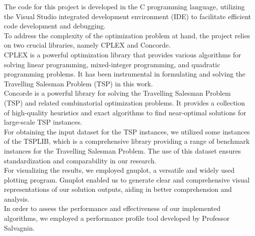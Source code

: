 The code for this project is developed in the C programming language, utilizing the Visual Studio integrated development environment (IDE) to facilitate efficient code development and debugging.
\\To address the complexity of the optimization problem at hand, the project relies on two crucial libraries, namely CPLEX \cite{CPLEX} and Concorde. \\CPLEX is a powerful optimization library that provides various algorithms for solving linear programming, mixed-integer programming, and quadratic programming problems. It has been instrumental in formulating and solving the Travelling Salesman Problem (TSP) in this work.
\\
Concorde is a powerful library for solving the Travelling Salesman Problem (TSP) and related combinatorial optimization problems. It provides a collection of high-quality heuristics and exact algorithms to find near-optimal solutions for large-scale TSP instances. 
\\
For obtaining the input dataset for the TSP instances, we utilized some instances of the TSPLIB, which is a comprehensive library providing a range of benchmark instances for the Travelling Salesman Problem. The use of this dataset ensures standardization and comparability in our research.
\\
For visualizing the results, we employed gnuplot, a versatile and widely used plotting program. Gnuplot enabled us to generate clear and comprehensive visual representations of our solution outputs, aiding in better comprehension and analysis.
\\
In order to assess the performance and effectiveness of our implemented algorithms, we employed a performance profile tool developed by Professor Salvagnin.
